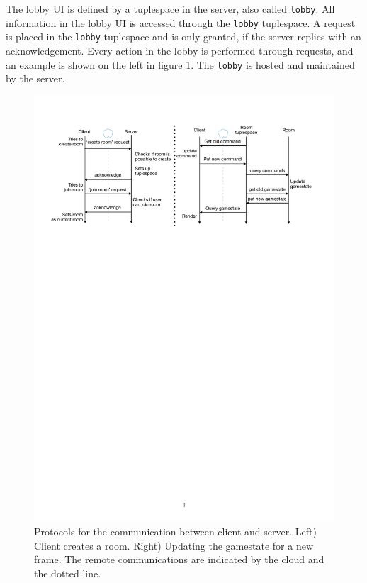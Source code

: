 
The lobby UI is defined by a tuplespace in the server, also called \texttt{lobby}. All information in the lobby UI is accessed through the \texttt{lobby} tuplespace. A request is placed in the \texttt{lobby} tuplespace and is only granted, if the server replies with an acknowledgement. Every action in the lobby is performed through requests, and an example is shown on the left in figure \ref{fig:Protocols}. The \texttt{lobby} is hosted and maintained by the server.


\begin{figure}
    \centering
    \includegraphics[width=\textwidth]{figures/Protocols.pdf}
    \caption{Protocols for the communication between client and server. Left) Client creates a room. Right) Updating the gamestate for a new frame. The remote communications are indicated by the cloud and the dotted line.}
    \label{fig:Protocols}
\end{figure}



